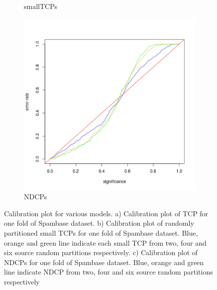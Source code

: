 \documentclass[preprint,12pt,authoryear]{elsarticle}
\begin{document}
\begin{figure}[H]
\begin{center}
\begin{subfigure}{.3\textwidth}
  \caption{smallTCPs}\label{fig:valIndividual}
  \end{subfigure}
  \begin{subfigure}{.3\textwidth}
  \centering
  \includegraphics[scale=0.2]{eqSourceCombined}
  \caption{NDCPs}\label{fig:valCombined}
  \end{subfigure}
  
 \caption{Calibration plot for various models. a) Calibration plot of TCP for one fold of Spambase dataset. b) Calibration plot of randomly partitioned small TCPs for one fold of  Spambase dataset. Blue, orange and  green line indicate each small TCP from two, four and six source random partitions respectively. c) Calibration plot of NDCPs for one fold of Spambase dataset. Blue, orange and  green line indicate NDCP from two, four and six source random partitions respectively}
 
\end{center}
\end{figure}




\end{document}

